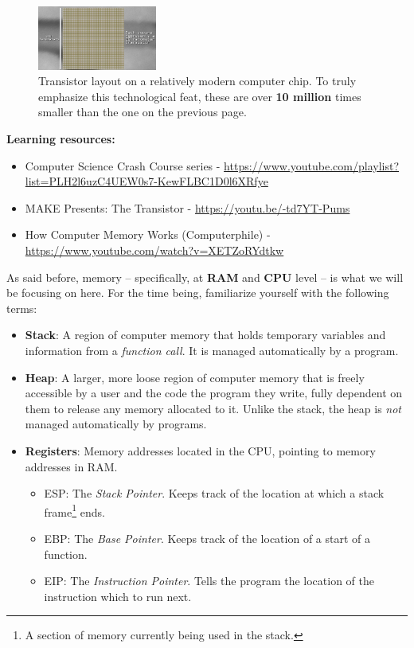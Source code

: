 \documentclass[a4paper,11pt]{article}
\begin{document}
\newpage

\begin{figure}[h]
    \centering
    \includegraphics[width=0.35\textwidth]{images/small_transistors.jpeg}
    \caption{Transistor layout on a relatively modern computer chip. To truly emphasize this technological feat, these are over {\bfseries 10 million} times smaller than the one on the previous page.}
\end{figure}

{\bfseries Learning resources:}
\begin{itemize}
    \item Computer Science Crash Course series - \url{https://www.youtube.com/playlist?list=PLH2l6uzC4UEW0s7-KewFLBC1D0l6XRfye}
    \item MAKE Presents: The Transistor - \url{https://youtu.be/-td7YT-Pums}
    \item How Computer Memory Works (Computerphile) - \url{https://www.youtube.com/watch?v=XETZoRYdtkw}
\end{itemize}
\vspace{0.2cm}

As said before, memory -- specifically, at {\bfseries RAM} and {\bfseries CPU} level -- is what we will be focusing on here. For the time being, familiarize yourself with the following terms:

\begin{itemize}
    \item {\bfseries Stack}: A region of computer memory that holds temporary variables and information from a \textit{function call}. It is managed automatically by a program.
    \item {\bfseries Heap}: A larger, more loose region of computer memory that is freely accessible by a user and the code the program they write, fully dependent on them to release any memory allocated to it. Unlike the stack, the heap is \textit{not} managed automatically by programs.
    \item {\bfseries Registers}: Memory addresses located in the CPU, pointing to memory addresses in RAM.
    \begin{itemize}
        \item ESP: The \textit{Stack Pointer}. Keeps track of the location at which a stack frame\footnote[2]{A section of memory currently being used in the stack.} ends.
        \item EBP: The \textit{Base Pointer}. Keeps track of the location of a start of a function.
        \item EIP: The \textit{Instruction Pointer}. Tells the program the location of the instruction which to run next.
    \end{itemize}
\end{itemize}
\end{document}
